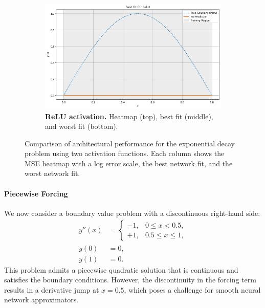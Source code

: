 \begin{figure}[h]
\begin{subfigure}[t]{0.48\textwidth}
        \includegraphics[width=\textwidth]{graphics/bvp_poisson_best_fit_relu_1layers_1width.png}
        \caption{\textbf{ReLU activation.} Heatmap (top), best fit (middle), and worst fit (bottom).}
        \label{fig:ivp_periodic_relu}
    \end{subfigure}
    \hspace*{\fill}
    \caption{Comparison of architectural performance for the exponential decay problem using two 
    activation functions. Each column shows the MSE heatmap with a log error scale,
    the best network fit, and the worst network fit.}
    \label{fig:bvp_poisson_sidebyside}
\end{figure}



\paragraph{Piecewise Forcing}

We now consider a boundary value problem with a discontinuous right-hand side:
\[
\begin{aligned}
    y''(x) &= 
    \begin{cases}
        -1, & 0 \leq x < 0.5, \\
        +1, & 0.5 \leq x \leq 1,
    \end{cases} \\
    y(0) &= 0, \\
    y(1) &= 0.
\end{aligned}
\]
This problem admits a piecewise quadratic solution that is continuous and satisfies the boundary 
conditions. However, the discontinuity in the forcing term results in a derivative jump at 
\( x = 0.5 \), which poses a challenge for smooth neural network approximators.

